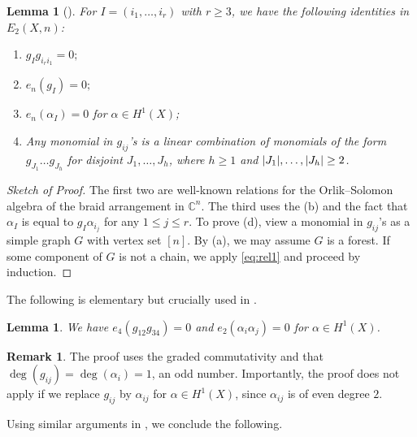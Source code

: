 \documentclass[11pt,reqno]{amsproc}
\numberwithin{equation}{section}
\newtheorem{lemma}[theorem]{Lemma}
\theoremstyle{definition}
\newtheorem{remark}[theorem]{Remark}
\theoremstyle{remark}
\newcommand\C{{\mathbb C}}
\DeclarePairedDelimiter{\abs}{\lvert}{\rvert}
\begin{document}
\begin{lemma}[\cite{cheonghuang2022betti}]
For $I=(i_1,\dots,i_r)$ with $r\geq 3$, we have the following identities in $E_2(X,n)$:
\begin{enumerate}
\item $g_I g_{i_r i_1}=0;$
\item $e_n(g_I)=0;$
\item $e_n(\alpha_I)=0$ for $\alpha\in H^1(X)$;
\item Any monomial in $g_{ij}$'s is a linear combination of monomials of the form $g_{J_1}\dots g_{J_h}$ for disjoint $J_1,\dots,J_h$, where $h\geq 1$ and $\abs{J_1},\dots,\abs{J_h}\geq 2$. 
\end{enumerate}
\end{lemma}
\begin{proof}[Sketch of Proof]
The first two are well-known relations for the Orlik--Solomon algebra of the braid arrangement in $\C^n$. The third uses the (b) and the fact that $\alpha_I$ is equal to $g_I \alpha_{i_j}$ for any $1\leq j\leq r$. To prove (d), view a monomial in $g_{ij}$'s as a simple graph $G$ with vertex set $[n]$. By (a), we may assume $G$ is a forest. If some component of $G$ is not a chain, we apply \eqref{eq:rel1} and proceed by induction.
\end{proof}

The following is elementary but crucially used in \cite{cheonghuang2022betti}.

\begin{lemma}
We have $e_4(g_{12}g_{34})=0$ and $e_2(\alpha_i \alpha_j)=0$ for $\alpha\in H^1(X)$.
\end{lemma}

\begin{remark}
The proof uses the graded commutativity and that $\deg(g_{ij})=\deg(\alpha_i)=1$, an odd number. Importantly, the proof does not apply if we replace $g_{ij}$ by $\alpha_{ij}$ for $\alpha\in H^1(X)$, since $\alpha_{ij}$ is of even degree $2$.
\end{remark}

Using similar arguments in \cite{cheonghuang2022betti}, we conclude the following.
\end{document}
